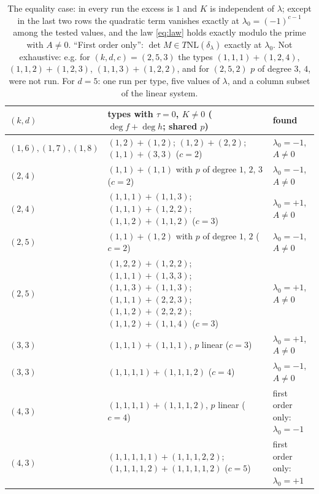 \documentclass[11pt]{article}
\numberwithin{equation}{section}
\theoremstyle{remark}
\newcommand{\NL}{\mathrm{NL}}
\newcommand{\lz}{\lambda_0}
\begin{document}
\begin{table}[h]\centering\small
\begin{tabular}{l>{\raggedright\arraybackslash}p{}>{\raggedright\arraybackslash}p{}}
\toprule
$(k,d)$ & types with $\tau=0$, $K\ne0$ ($\deg f+\deg h$; shared $p$) & found\\
\midrule
$(1,6),(1,7),(1,8)$ & $(1,2)+(1,2)$; $(1,2)+(2,2)$; $(1,1)+(3,3)$ \quad($c=2$) & $\lz=-1$, $A\ne0$\\
$(2,4)$ & $(1,1)+(1,1)$ with $p$ of degree $1$, $2$, $3$ \quad($c=2$) & $\lz=-1$, $A\ne0$\\
$(2,4)$ & $(1,1,1)+(1,1,3)$; $(1,1,1)+(1,2,2)$; $(1,1,2)+(1,1,2)$ \quad($c=3$) & $\lz=+1$, $A\ne0$\\
$(2,5)$ & $(1,1)+(1,2)$ with $p$ of degree $1$, $2$ \quad($c=2$) & $\lz=-1$, $A\ne0$\\
$(2,5)$ & $(1,2,2)+(1,2,2)$; $(1,1,1)+(1,3,3)$; $(1,1,3)+(1,1,3)$; $(1,1,1)+(2,2,3)$;
$(1,1,2)+(2,2,2)$; $(1,1,2)+(1,1,4)$ \quad($c=3$) & $\lz=+1$, $A\ne0$\\
$(3,3)$ & $(1,1,1)+(1,1,1)$, $p$ linear \quad($c=3$) & $\lz=+1$, $A\ne0$\\
$(3,3)$ & $(1,1,1,1)+(1,1,1,2)$ \quad($c=4$) & $\lz=-1$, $A\ne0$\\
$(4,3)$ & $(1,1,1,1)+(1,1,1,2)$, $p$ linear \quad($c=4$) & first order only: $\lz=-1$\\
$(4,3)$ & $(1,1,1,1,1)+(1,1,1,2,2)$; $(1,1,1,1,2)+(1,1,1,1,2)$ \quad($c=5$) & first order only: $\lz=+1$\\
\bottomrule
\end{tabular}
\caption{The equality case: in every run the excess is $1$ and $K$ is independent of $\lambda$; except in the
last two rows the quadratic term vanishes exactly at $\lz=(-1)^{c-1}$ among the tested values, and the law
\eqref{eq:law} holds exactly modulo the prime with $A\neq0$. ``First order only'': $\det M\in T\NL(\delta_\lambda)$
exactly at $\lz$. Not exhaustive: e.g. for $(k,d,c)=(2,5,3)$ the types $(1,1,1)+(1,2,4)$, $(1,1,2)+(1,2,3)$,
$(1,1,3)+(1,2,2)$, and for $(2,5,2)$ $p$ of degree $3$, $4$, were not run. For $d=5$: one run per type, five
values of $\lambda$, and a column subset of the linear system.}\label{tab:types}
\end{table}
\end{document}
